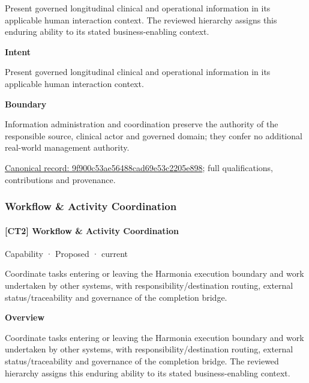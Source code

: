 Present governed longitudinal clinical and operational information in its applicable human interaction context. The reviewed hierarchy assigns this enduring ability to its stated business-enabling context.



\textbf{Intent}



Present governed longitudinal clinical and operational information in its applicable human interaction context.



\textbf{Boundary}



Information administration and coordination preserve the authority of the responsible source, clinical actor and governed domain; they confer no additional real-world management authority.


{\footnotesize \href{../../../../continuum/strategy/capability/9f900c53ae56488cad69e53c2205e898.md}{Canonical record: 9f900c53ae56488cad69e53c2205e898}; full qualifications, contributions and provenance.}\par
\subsubsection{Workflow \& Activity Coordination}

\paragraph{[CT2] Workflow \& Activity Coordination}

\label{element:c724f3d38bfa4567983a11ad22095d61}
{\small Capability · Proposed · current}\par

Coordinate tasks entering or leaving the Harmonia execution boundary and work undertaken by other systems, with responsibility/destination routing, external status/traceability and governance of the completion bridge.



\textbf{Overview}



Coordinate tasks entering or leaving the Harmonia execution boundary and work undertaken by other systems, with responsibility/destination routing, external status/traceability and governance of the completion bridge. The reviewed hierarchy assigns this enduring ability to its stated business-enabling context.



